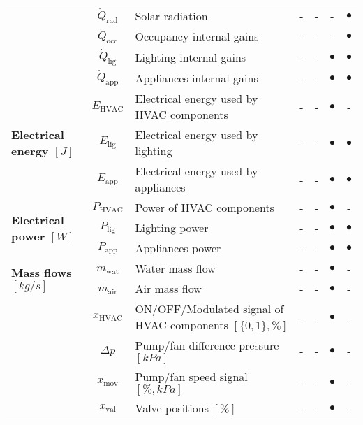 \documentclass[10pt]{extarticle}
\begin{document}
\begin{table}[h]
\begin{adjustwidth}{-1cm}{}
\begin{tabular}{l|c|l|cccc}
		& $\dot{Q}_{\text{rad}}$ & Solar radiation & - & - & - & $\bullet$  \\
		& $\dot{Q}_{\text{occ}}$ & Occupancy internal gains & - & - & - & $\bullet$  \\
		& $\dot{Q}_{\text{lig}}$ & Lighting internal gains & - & - & $\bullet$ & $\bullet$  \\
		& $\dot{Q}_{\text{app}}$ & Appliances internal gains & - & - & $\bullet$ & $\bullet$  \\
		\midrule
		\multirow{3}{*}{\textbf{Electrical energy $[J]$}} 
		& $E_{\text{HVAC}}$ & Electrical energy used by HVAC components & - & - &  $\bullet$ &- \\
		& $E_{\text{lig}}$ & Electrical energy used by lighting & - & - & $\bullet$ & $\bullet$ \\
		& $E_{\text{app}}$ & Electrical energy used by appliances & - & - & $\bullet$ & $\bullet$ \\
		\midrule
		\multirow{3}{*}{\textbf{Electrical power $[W]$}} 
		& $P_{\text{HVAC}}$ & Power of HVAC components & - & - &  $\bullet$ &- \\
		& $P_{\text{lig}}$ & Lighting power & - & - & $\bullet$ & $\bullet$ \\
		& $P_{\text{app}}$ & Appliances power & - & - & $\bullet$ & $\bullet$ \\
\midrule
		\multirow{2}{*}{\textbf{Mass flows $[kg/s]$}} &
		$\dot{m}_{\text{wat}}$ & Water mass flow & - & - & $\bullet$ & - \\
		& $\dot{m}_{\text{air}}$ & Air mass flow & - & - & $\bullet$ & - \\
		\midrule
		\multirow{5}{*}{\textbf{\shortstack[l]{Component signals }}} 
		& $x_{\text{HVAC}}$ & ON/OFF/Modulated signal of HVAC components $[\{0,1\},\%]$ & - & - & $\bullet$ & - \\
		& $\Delta p$ & Pump/fan difference pressure $[kPa]$ & - & - & $\bullet$ & - \\
		& $x_{\text{mov}}$ & Pump/fan speed signal $[\%,kPa]$ & - & - & $\bullet$ & - \\
		& $x_{\text{val}}$ & Valve positions $[\%]$ & - & - & $\bullet$ & - \\

\end{tabular}
\end{adjustwidth}
\end{table}
\end{document}

